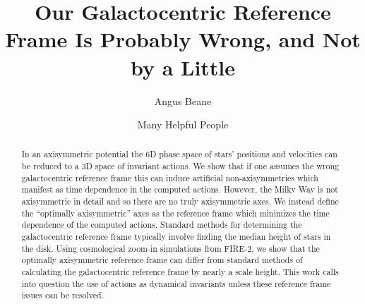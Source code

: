 \documentclass[twocolumn]{aastex62}
\begin{document}
\title{Our Galactocentric Reference Frame Is Probably Wrong, and Not by a
Little}


\author{Angus Beane}

\author{Many Helpful People}
\noaffiliation

\begin{abstract}

In an axisymmetric potential the 6D phase space of stars' positions and
velocities can be reduced to a 3D space of invariant actions. We show that if
one assumes the wrong galactocentric reference frame this can induce
artificial non-axisymmetries which manifest as time dependence in the computed
actions. However, the Milky Way is not axisymmetric in detail and so there are
no truly axisymmetric axes. We instead define the  ``optimally axisymmetric''
axes as the reference frame which minimizes the time dependence of the
computed actions. Standard methods for determining the galactocentric
reference frame typically involve finding the median height of stars in the
disk. Using cosmological zoom-in simulations from FIRE-2, we show that the
optimally axisymmetric reference frame can differ from standard methods of
calculating the galactocentric reference frame by nearly a scale height. This
work calls into question the use of actions as dynamical invariants unless
these reference frame issues can be resolved.



\end{abstract}
\end{document}

